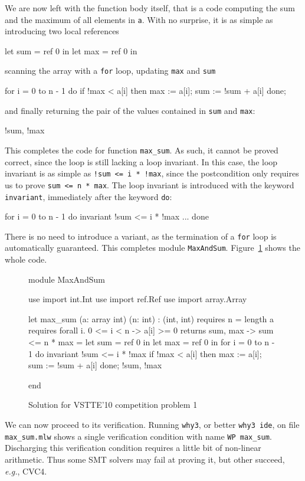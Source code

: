 We are now left with the function body itself, that is a code
computing the sum and the maximum of all elements in \texttt{a}. With
no surprise, it is as simple as introducing two local references
\begin{whycode}
    let sum = ref 0 in
    let max = ref 0 in
\end{whycode}
scanning the array with a \texttt{for} loop, updating \texttt{max}
and \texttt{sum}
\begin{whycode}
    for i = 0 to n - 1 do
      if !max < a[i] then max := a[i];
      sum := !sum + a[i]
    done;
\end{whycode}
and finally returning the pair of the values contained in \texttt{sum}
and \texttt{max}:
\begin{whycode}
  !sum, !max
\end{whycode}
This completes the code for function \texttt{max\_sum}.
As such, it cannot be proved correct, since the loop is still lacking
a loop invariant. In this case, the loop invariant is as simple as
\verb|!sum <= i * !max|, since the postcondition only requires us to prove
\verb|sum <= n * max|. The loop invariant is introduced with the
keyword \texttt{invariant}, immediately after the keyword \texttt{do}:
\begin{whycode}
    for i = 0 to n - 1 do
      invariant { !sum <= i * !max }
      ...
    done
\end{whycode}
There is no need to introduce a variant, as the termination of a
\texttt{for} loop is automatically guaranteed.
This completes module \texttt{MaxAndSum}.
Figure~\ref{fig:MaxAndSum} shows the whole code.
\begin{figure}
  \centering
\begin{whycode}
module MaxAndSum

  use import int.Int
  use import ref.Ref
  use import array.Array

  let max_sum (a: array int) (n: int) : (int, int)
    requires { n = length a }
    requires { forall i. 0 <= i < n -> a[i] >= 0 }
    returns  { sum, max -> sum <= n * max }
  = let sum = ref 0 in
    let max = ref 0 in
    for i = 0 to n - 1 do
      invariant { !sum <= i * !max }
      if !max < a[i] then max := a[i];
      sum := !sum + a[i]
    done;
    !sum, !max

end
\end{whycode}
\vspace*{-1em}%
  \caption{Solution for VSTTE'10 competition problem 1}
  \label{fig:MaxAndSum}
\end{figure}
We can now proceed to its verification.
Running \texttt{why3}, or better \texttt{why3 ide}, on file
\verb|max_sum.mlw| shows a single verification condition with name
\verb|WP max_sum|.
Discharging this verification condition requires a little bit of non-linear
arithmetic. Thus some SMT solvers may fail at proving it, but other
succeed, \emph{e.g.}, CVC4.

